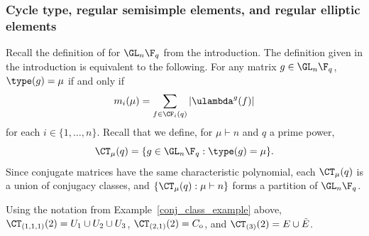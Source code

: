 



























































\subsubsection{Cycle type, regular semisimple elements, and regular elliptic elements}
\label{cycle_rs_re}

Recall the definition of  for \(\GL_n \F_q\) from the introduction.
The definition given in the introduction is equivalent to the following.
For any matrix \(g \in \GL_n \F_q\), \(\type (g) = \mu\) if and only if
\[
m_i (\mu)
=
\sum_{f \in \CF_i (q)}
| \ulambda^g (f) |
\]
for each \(i \in \{1,\ldots,n\}\).
Recall that we define, for \(\mu \vdash n\) and \(q\) a prime power,
\begin{equation}
\label{type_set}
\CT_\mu (q) = \{g \in \GL_n \F_q : \type (g) = \mu \}.
\end{equation}
Since conjugate matrices have the same characteristic polynomial, each $\CT_\mu (q)$ is a union of conjugacy classes, and $\{\CT_\mu (q): \mu \vdash n\}$ forms a partition of $\GL_n \F_q$.
\begin{example}
Using the notation from Example~\ref{conj_class_example} above,
\(\CT_{(1,1,1)} (2) = U_1 \cup U_2 \cup U_3\),
\(\CT_{(2,1)} (2) = C_{\mathrm{o}}\), and
\(\CT_{(3)} (2) = E \cup \tilde{E}\).
\end{example}

